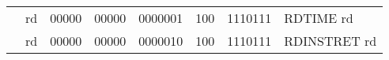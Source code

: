 \begin{table}[p]
\begin{small}
\begin{center}
\begin{tabular}{rccccccccccl}
&
\multicolumn{1}{|c|}{rd} &
\multicolumn{1}{c|}{00000} &
\multicolumn{1}{c|}{00000} &
\multicolumn{4}{c|}{0000001} &
\multicolumn{2}{c|}{100} &
\multicolumn{1}{c|}{1110111} & RDTIME rd \\
\cline{2-11}
  

&
\multicolumn{1}{|c|}{rd} &
\multicolumn{1}{c|}{00000} &
\multicolumn{1}{c|}{00000} &
\multicolumn{4}{c|}{0000010} &
\multicolumn{2}{c|}{100} &
\multicolumn{1}{c|}{1110111} & RDINSTRET rd \\
\cline{2-11}
  

\end{tabular}
\end{center}
\end{small}

\label{instr-table}
\end{table}
  

\newpage

